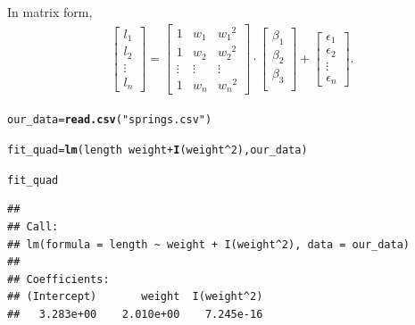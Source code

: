 \documentclass[11pt, a4paper]{article}\usepackage[]{graphicx}\usepackage[]{xcolor}
\makeatletter
\newcommand{\hlnum}[1]{\textcolor[rgb]{0.686,0.059,0.569}{#1}}%
\newcommand{\hlsng}[1]{\textcolor[rgb]{0.192,0.494,0.8}{#1}}%
\newcommand{\hlopt}[1]{\textcolor[rgb]{0,0,0}{#1}}%
\newcommand{\hldef}[1]{\textcolor[rgb]{0.345,0.345,0.345}{#1}}%
\newcommand{\hlkwb}[1]{\textcolor[rgb]{0.69,0.353,0.396}{#1}}%
\newcommand{\hlkwd}[1]{\textcolor[rgb]{0.737,0.353,0.396}{\textbf{#1}}}%
\newenvironment{kframe}{%
 \def\at@end@of@kframe{}%
 \ifinner\ifhmode%
  \def\at@end@of@kframe{\end{minipage}}%
  \begin{minipage}{\columnwidth}%
 \fi\fi%
 \def\FrameCommand##1{\hskip\@totalleftmargin \hskip-\fboxsep
 \colorbox{shadecolor}{##1}\hskip-\fboxsep
     \hskip-\linewidth \hskip-\@totalleftmargin \hskip\columnwidth}%
 \MakeFramed {\advance\hsize-\width
   \@totalleftmargin\z@ \linewidth\hsize
   \@setminipage}}%
 {\par\unskip\endMakeFramed%
 \at@end@of@kframe}
\newenvironment{knitrout}{}{} %
\makeatother
\begin{document}
In matrix form, 
\begin{gather}
	\begin{bmatrix} l_1 \\	l_2 \\	\vdots \\	l_n	\end{bmatrix}
	=
	\begin{bmatrix}	1 & w_1 & {w_1}^2 \\	1 & w_2 & {w_2}^2 \\	\vdots & \vdots & \vdots \\	1 & w_n	& {w_n}^2 \end{bmatrix} 
	\cdot
	\begin{bmatrix}	\beta_1 \\	\beta_2 \\	\beta_3 \\ \end{bmatrix}  
	+	
	\begin{bmatrix}  \epsilon_1 \\	\epsilon_2 \\	\vdots \\	\epsilon_n	\end{bmatrix}.
\end{gather}

\begin{knitrout}
\color{fgcolor}\begin{kframe}
\begin{alltt}
\hldef{our_data} \hlkwb{=} \hlkwd{read.csv}\hldef{(}\hlsng{"springs.csv"}\hldef{)}
\end{alltt}
\end{kframe}
\end{knitrout}

\begin{knitrout}
\color{fgcolor}\begin{kframe}
\begin{alltt}
\hldef{fit_quad} \hlkwb{=} \hlkwd{lm}\hldef{(length} \hlopt{~} \hldef{weight} \hlopt{+} \hlkwd{I}\hldef{(weight}\hlopt{^}\hlnum{2}\hldef{), our_data)}
\end{alltt}
\end{kframe}
\end{knitrout}

\begin{knitrout}
\color{fgcolor}\begin{kframe}
\begin{alltt}
\hldef{fit_quad}
\end{alltt}
\begin{verbatim}
## 
## Call:
## lm(formula = length ~ weight + I(weight^2), data = our_data)
## 
## Coefficients:
## (Intercept)       weight  I(weight^2)  
##   3.283e+00    2.010e+00    7.245e-16
\end{verbatim}
\end{kframe}
\end{knitrout}
\end{document}
